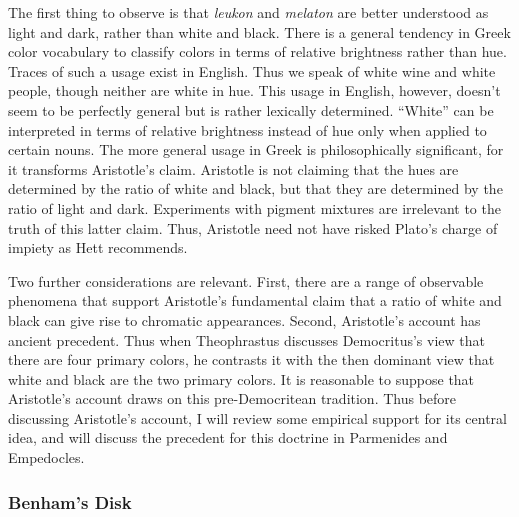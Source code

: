 The first thing to observe is that \emph{leukon} and \emph{melaton} are better understood as light and dark, rather than white and black. There is a general tendency in Greek color vocabulary to classify colors in terms of relative brightness rather than hue. Traces of such a usage exist in English. Thus we speak of white wine and white people, though neither are white in hue. This usage in English, however, doesn't seem to be perfectly general but is rather lexically determined. ``White'' can be interpreted in terms of relative brightness instead of hue only when applied to certain nouns. The more general usage in Greek is philosophically significant, for it transforms Aristotle's claim. Aristotle is not claiming that the hues are determined by the ratio of white and black, but that they are determined by the ratio of light and dark. Experiments with pigment mixtures are irrelevant to the truth of this latter claim. Thus, Aristotle need not have risked Plato's charge of impiety as Hett recommends. 

Two further considerations are relevant. First, there are a range of observable phenomena that support Aristotle's fundamental claim that a ratio of white and black can give rise to chromatic appearances. Second, Aristotle's account has ancient precedent. Thus when Theophrastus discusses Democritus's view that there are four primary colors, he contrasts it with the then dominant view that white and black are the two primary colors. It is reasonable to suppose that Aristotle's account draws on this pre-Democritean tradition. Thus before discussing Aristotle's account, I will review some empirical support for its central idea, and will discuss the precedent for this doctrine in Parmenides and Empedocles. \change

\begin{frame}[t]\frametitle{Benham's Disk}
	\begin{center}
	\end{center}
\end{frame}

